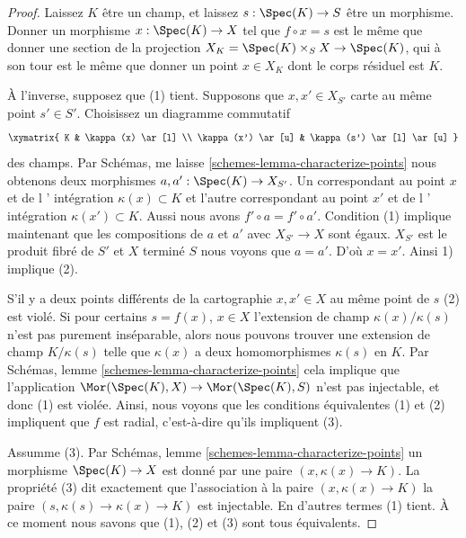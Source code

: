 \begin{proof}
Laissez $K$ être un champ, et laissez $s : \Spec(K) \to S$ être un morphisme. Donner un morphisme $x : \Spec(K) \to X$ tel que $f \circ x = s$ est le même que donner une section de la projection $X_K = \Spec(K) \times_S X \to \Spec(K)$, qui à son tour est le même que donner un point $x \in X_K$ dont le corps résiduel est $K$.

\medskip\noindent

À l'inverse, supposez que (1) tient. Supposons que $x, x' \in X_{S'}$
carte au même point $s' \in S'$. Choisissez un diagramme commutatif
$$
\xymatrix{
K & \kappa(x) \ar[l] \\
\kappa(x') \ar[u] & \kappa(s') \ar[l] \ar[u]
}
$$
des champs. Par Schémas, me laisse \ref{schemes-lemma-characterize-points}
nous obtenons deux morphismes $a, a' : \Spec(K) \to X_{S'}$. Un correspondant au point $x$ et de l ' intégration $\kappa(x) \subset K$ et l'autre correspondant au point $x'$ et de l ' intégration
$\kappa(x') \subset K$. Aussi nous avons $f' \circ a = f' \circ a'$. Condition (1) implique maintenant que les compositions de $a$ et $a'$ avec
$X_{S'} \to X$ sont égaux. $X_{S'}$ est le produit fibré de $S'$ et $X$ terminé $S$ nous voyons que $a = a'$. D'où $x = x'$. Ainsi 1) implique (2).

\medskip\noindent
S'il y a deux points différents de la cartographie $x, x' \in X$ au même point de $s$ (2) est violé. Si pour certains $s = f(x)$, $x \in X$ l'extension de champ $\kappa(x)/\kappa(s)$ n'est pas purement inséparable, alors nous pouvons trouver une extension de champ $K/\kappa(s)$ telle que $\kappa(x)$ a deux homomorphismes $\kappa(s)$ en $K$. Par Schémas, lemme \ref{schemes-lemma-characterize-points} cela implique que l'application $\Mor(\Spec(K), X) \to \Mor(\Spec(K), S)$ n'est pas injectable, et donc (1) est violée. Ainsi, nous voyons que les conditions équivalentes (1) et (2) impliquent que $f$ est radial, c'est-à-dire qu'ils impliquent (3).

\medskip\noindent
Assumme (3). Par Schémas, lemme \ref{schemes-lemma-characterize-points} un morphisme $\Spec(K) \to X$ est donné par une paire $(x, \kappa(x) \to K)$. La propriété (3) dit exactement que l'association à la paire $(x, \kappa(x) \to K)$ la paire $(s, \kappa(s) \to \kappa(x) \to K)$ est injectable. En d'autres termes (1) tient. À ce moment nous savons que (1), (2) et (3) sont tous équivalents.

\medskip\noindent


\end{proof}
